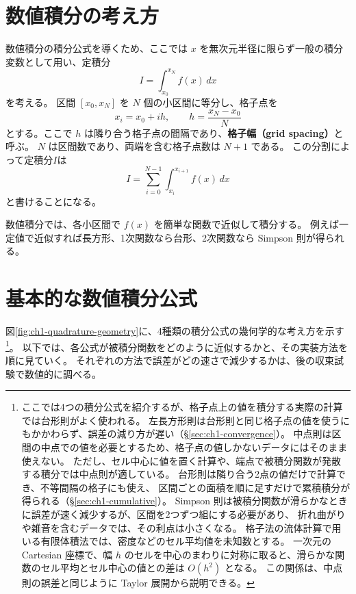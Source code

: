 \section{数値積分の考え方}
\label{sec:ch1-quadrature-basics}

数値積分の積分公式を導くため、ここでは $x$ を無次元半径に限らず一般の積分変数として用い、定積分
\begin{equation}
 I=\int_{x_0}^{x_N} f(x)\,dx
\label{eq:ch1-general-integral}
\end{equation}
を考える。
区間 $[x_0,x_N]$ を $N$ 個の小区間に等分し、格子点を
\begin{equation}
 x_i=x_0+ih,
 \qquad
 h=\frac{x_N-x_0}{N}
\label{eq:ch1-uniform-grid}
\end{equation}
とする。ここで $h$ は隣り合う格子点の間隔であり、\textbf{格子幅（grid spacing）}と呼ぶ。
$N$ は区間数であり、両端を含む格子点数は $N+1$ である。
この分割によって定積分$I$は
\begin{equation}
 I=\sum_{i=0}^{N-1}
 \int_{x_i}^{x_{i+1}} f(x)\,dx
\label{eq:ch1-split-integral}
\end{equation}
と書けることになる。

数値積分では、各小区間で $f(x)$ を簡単な関数で近似して積分する。
例えば一定値で近似すれば長方形、1次関数なら台形、2次関数なら Simpson 則が得られる。

\section{基本的な数値積分公式}
\label{sec:ch1-basic-rules}

図\ref{fig:ch1-quadrature-geometry}に、4種類の積分公式の幾何学的な考え方を示す\footnote{
ここでは4つの積分公式を紹介するが、格子点上の値を積分する実際の計算では台形則がよく使われる。
左長方形則は台形則と同じ格子点の値を使うにもかかわらず、誤差の減り方が遅い（\S\ref{sec:ch1-convergence}）。
中点則は区間の中点での値を必要とするため、格子点の値しかないデータにはそのまま使えない。
ただし、セル中心に値を置く計算や、端点で被積分関数が発散する積分では中点則が適している。
台形則は隣り合う2点の値だけで計算でき、不等間隔の格子にも使え、
区間ごとの面積を順に足すだけで累積積分が得られる（\S\ref{sec:ch1-cumulative}）。
Simpson 則は被積分関数が滑らかなときに誤差が速く減少するが、区間を2つずつ組にする必要があり、
折れ曲がりや雑音を含むデータでは、その利点は小さくなる。
格子法の流体計算で用いる有限体積法では、密度などのセル平均値を未知数とする。
一次元の Cartesian 座標で、幅 $h$ のセルを中心のまわりに対称に取ると、滑らかな関数のセル平均とセル中心の値との差は $O(h^2)$ となる。
この関係は、中点則の誤差と同じように Taylor 展開から説明できる\cite{matsumoto}。}。
以下では、各公式が被積分関数をどのように近似するかと、その実装方法を順に見ていく。
それぞれの方法で誤差がどの速さで減少するかは、後の収束試験で数値的に調べる。


